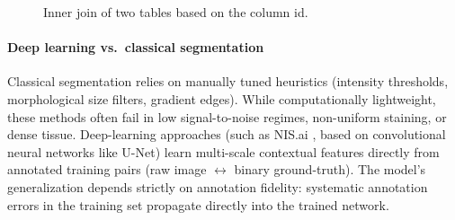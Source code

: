 \begin{figure}[ht]\centering
  \caption{Inner join of two tables based on the column id.}
  \label{fig:join}
\end{figure}

\paragraph{Deep learning vs.\ classical segmentation} Classical segmentation relies on manually tuned heuristics (intensity thresholds, morphological size filters, gradient edges). While computationally lightweight, these methods often fail in low signal-to-noise regimes, non-uniform staining, or dense tissue. Deep-learning approaches (such as NIS.ai , based on convolutional neural networks like U-Net) learn multi-scale contextual features directly from annotated training pairs (raw image $\leftrightarrow$ binary ground-truth). The model's generalization depends strictly on annotation fidelity: systematic annotation errors in the training set propagate directly into the trained network.



